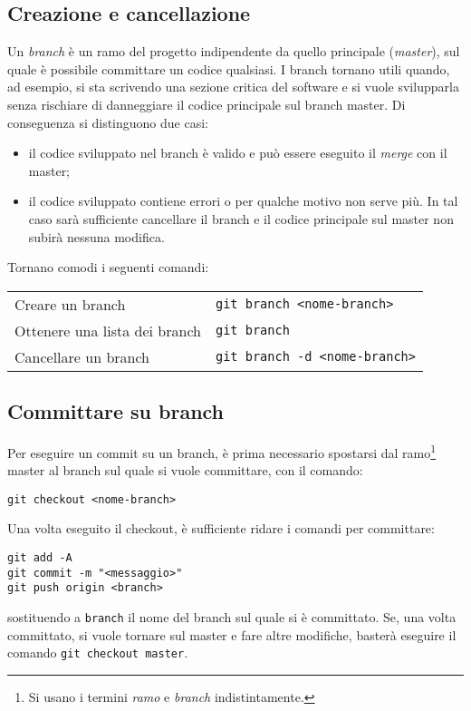\documentclass[a4paper, 11pt]{article}
\begin{document}
	\subsection{Creazione e cancellazione}
	Un \emph{branch} è un ramo del progetto indipendente da quello principale (\emph{master}), sul quale è possibile committare un codice qualsiasi. I branch tornano utili quando, ad esempio, si sta scrivendo una sezione critica del software e si vuole svilupparla senza rischiare di danneggiare il codice principale sul branch master. Di conseguenza si distinguono due casi:
	\begin{itemize}
		\item il codice sviluppato nel branch è valido e può essere eseguito il \emph{merge} con il master;
		\item il codice sviluppato contiene errori o per qualche motivo non serve più. In tal caso sarà sufficiente cancellare il branch e il codice principale sul master non subirà nessuna modifica.
	\end{itemize}
	Tornano comodi i seguenti comandi: 
	\begin{center}
			\begin{tabular}{ll}
				Creare un branch & \lstinline|git branch <nome-branch>| \\
				Ottenere una lista dei branch & \lstinline|git branch| \\
				Cancellare un branch & \lstinline|git branch -d <nome-branch>|
			\end{tabular}
	\end{center}
	
	\subsection{Committare su branch}
	Per eseguire un commit su un branch, è prima necessario spostarsi dal ramo\footnote{Si usano i termini \emph{ramo} e \emph{branch} indistintamente.} master al branch sul quale si vuole committare, con il comando: \begin{lstlisting}
git checkout <nome-branch>
	\end{lstlisting}
	
	Una volta eseguito il checkout, è sufficiente ridare i comandi per committare: \begin{lstlisting}
git add -A
git commit -m "<messaggio>"
git push origin <branch>
	\end{lstlisting}
	sostituendo a \lstinline|branch| il nome del branch sul quale si è committato. Se, una volta committato, si vuole tornare sul master e fare altre modifiche, basterà eseguire il comando \lstinline|git checkout master|.
	
\end{document}
